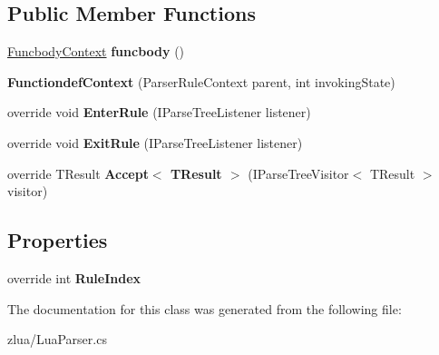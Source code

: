 \subsection*{Public Member Functions}
\begin{DoxyCompactItemize}
\item 
\mbox{\label{classzlua_1_1_lua_parser_1_1_functiondef_context_a87f0da9372f14f1a32cee0f30b880cf3}} 
\mbox{\hyperlink{classzlua_1_1_lua_parser_1_1_funcbody_context}{Funcbody\+Context}} {\bfseries funcbody} ()
\item 
\mbox{\label{classzlua_1_1_lua_parser_1_1_functiondef_context_a100661ed3994f15b5a612166d56f6523}} 
{\bfseries Functiondef\+Context} (Parser\+Rule\+Context parent, int invoking\+State)
\item 
\mbox{\label{classzlua_1_1_lua_parser_1_1_functiondef_context_af57ac3aa90ad102d98f550c13b258db1}} 
override void {\bfseries Enter\+Rule} (I\+Parse\+Tree\+Listener listener)
\item 
\mbox{\label{classzlua_1_1_lua_parser_1_1_functiondef_context_acf6f364f0a0bfe6b6f8b46d2b19f1ba4}} 
override void {\bfseries Exit\+Rule} (I\+Parse\+Tree\+Listener listener)
\item 
\mbox{\label{classzlua_1_1_lua_parser_1_1_functiondef_context_a6ac70448dad6b4940b6f5f32591a8349}} 
override T\+Result {\bfseries Accept$<$ T\+Result $>$} (I\+Parse\+Tree\+Visitor$<$ T\+Result $>$ visitor)
\end{DoxyCompactItemize}
\subsection*{Properties}
\begin{DoxyCompactItemize}
\item 
\mbox{\label{classzlua_1_1_lua_parser_1_1_functiondef_context_a4ad1b35a2721c9bb09ca4a86aeaefe35}} 
override int {\bfseries Rule\+Index}
\end{DoxyCompactItemize}


The documentation for this class was generated from the following file\+:\begin{DoxyCompactItemize}
\item 
zlua/Lua\+Parser.\+cs\end{DoxyCompactItemize}
